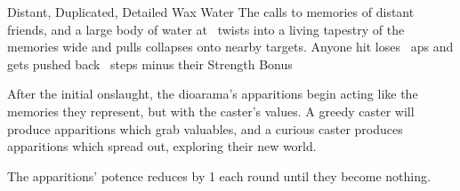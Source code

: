   {Distant, Duplicated, Detailed}%
  {Wax}%
  {Water}%
  {}%
  {The  calls to memories of distant friends, and a large body of water at \spellRange\ twists into a living tapestry of the memories  wide and pulls collapses onto nearby targets.
  Anyone hit loses ~\glspl{ap} and gets pushed back ~\glspl{step} minus their Strength Bonus}%
  {
  After the initial onslaught, the dioarama's apparitions begin acting like the memories they represent, but with the caster's values.
  A greedy caster will produce apparitions which grab valuables, and a curious caster produces apparitions which spread out, exploring their new world.

  The apparitions' potence reduces by 1 each \gls{round} until they become nothing.}
